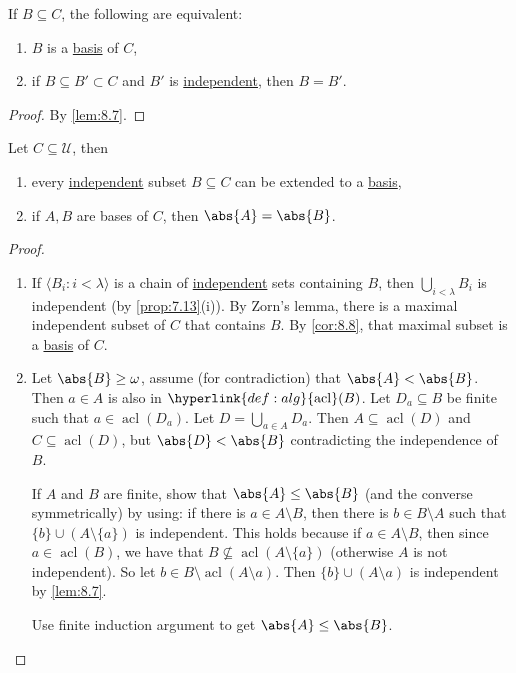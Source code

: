 \documentclass{article}
\DeclareMathOperator{\acl}{acl}
\newcommand{\named}[1]{\textbf{#1}\index{#1}}
\newcommand{\U}{\mathcal{U}}
\begin{document}
\begin{ncor}\label{cor:8.8}
  If $B \subseteq C$, the following are equivalent:
  \begin{enumerate}[label=(\roman*)]
    \item $B$ is a \hyperlink{def:basis}{basis} of $C$,
    \item if $B \subseteq B' \subset C$ and $B'$ is \hyperlink{def:indep}{independent}, then $B = B'$.
  \end{enumerate}
\end{ncor}
\begin{proof}
  By \cref{lem:8.7}.
\end{proof}
\begin{nthm}\label{thm:8.9}
  Let $C \subseteq \U$, then
  \begin{enumerate}[label=(\roman*)]
    \item every \hyperlink{def:indep}{independent} subset $B \subseteq C$ can be extended to a \hyperlink{def:basis}{basis},
    \item if $A,B$ are bases of $C$, then $\abs{A} = \abs{B}$.
  \end{enumerate}
\end{nthm}
\begin{proof}\leavevmode
  \begin{enumerate}[label=(\roman*)]
    \item If $\langle B_i : i < \lambda \rangle$ is a chain of \hyperlink{def:indep}{independent} sets containing $B$, then $\bigcup_{i < \lambda} B_i$ is independent (by \cref{prop:7.13}(i)).
      By Zorn's lemma, there is a maximal independent subset of $C$ that contains $B$. By \cref{cor:8.8}, that maximal subset is a \hyperlink{def:basis}{basis} of $C$.
    \item Let $\abs{B} \geq \omega$, assume (for contradiction) that $\abs{A} < \abs{B}$.
      Then $a \in A$ is also in $\hyperlink{def:alg}{\acl}(B)$.
      Let $D_a \subseteq B$ be finite such that $a \in \acl(D_a)$. Let $D = \bigcup_{a \in A} D_a$.
      Then $A \subseteq \acl(D)$ and $C \subseteq \acl(D)$, but $\abs{D} < \abs{B}$ contradicting the independence of $B$.

      If $A$ and $B$ are finite, show that $\abs{A} \leq \abs{B}$  (and the converse symmetrically) by using: if there is $a \in A \setminus B$, then there is $b \in B \setminus A$ such that $\{b\} \cup \left( A \setminus \{a\} \right)$ is independent.
      This holds because if $a \in A \setminus B$, then since $a \in \acl(B)$, we have that $B \nsubseteq \acl(A \setminus \{a\})$ (otherwise $A$ is not independent).
      So let $b \in B \setminus \acl(A \setminus a)$.
      Then $\{b\} \cup (A \setminus a)$ is independent by \cref{lem:8.7}.

      Use finite induction argument to get $\abs{A} \leq \abs{B}$. \qedhere
  \end{enumerate}
\end{proof}
\end{document}
